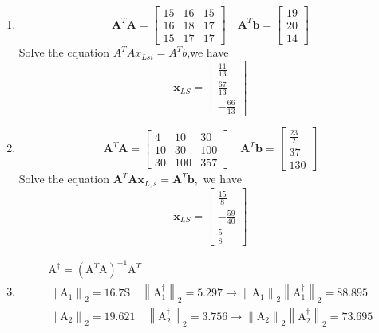 \documentclass[english,onecolumn]{IEEEtran}
\begin{document}
\begin{enumerate}
	\item 
	$$
	\mathbf{A}^{T} \mathbf{A}=\left[\begin{array}{lll}
		15 & 16 & 15 \\
		16 & 18 & 17 \\
		15 & 17 & 17
	\end{array}\right] \quad \mathbf{A}^{T} \mathbf{b}=\left[\begin{array}{l}
		19 \\
		20 \\
		14
	\end{array}\right]
	$$
	Solve the cquation $A^{T} A x_{L s i}=A^{T} b$,we have
	$$
	\mathbf{x}_{L S}=\left[\begin{array}{c}
		\frac{11}{13} \\
		\frac{67}{13} \\
		-\frac{66}{13}
	\end{array}\right]
	$$
	\item
	$$
	\mathbf{A}^{T} \mathbf{A}=\left[\begin{array}{ccc}
		4 & 10 & 30 \\
		10 & 30 & 100 \\
		30 & 100 & 357
	\end{array}\right] \quad \mathbf{A}^{T} \mathbf{b}=\left[\begin{array}{c}
		\frac{23}{2} \\
		37 \\
		130
	\end{array}\right]
	$$
	Solve the equation $\mathbf{A}^{T} \mathbf{A} \mathbf{x}_{L, s}=\mathbf{A}^{T} \mathbf{b},$ we have
	$$
	\mathbf{x}_{L S}=\left[\begin{array}{c}
		\frac{15}{8} \\
		-\frac{59}{40} \\
		\frac{5}{8}
	\end{array}\right]
	$$
	\item
	$$
	\begin{array}{c}
		\mathrm{A}^{\dagger}=\left(\mathrm{A}^{T} \mathrm{A}\right)^{-1} \mathrm{A}^{T} \\
		\left\|\mathrm{A}_{1}\right\|_{2}=16.7 \mathrm{S} \quad\left\|\mathrm{A}_{1}^{\dagger}\right\|_{2}=5.297 \rightarrow\left\|\mathrm{A}_{1}\right\|_{2}\left\|\mathrm{A}_{1}^{\dagger}\right\|_{2}=88.895 \\
		\left\|\mathrm{A}_{2}\right\|_{2}=19.621 \quad\left\|\mathrm{A}_{2}^{\dagger}\right\|_{2}=3.756 \rightarrow\left\|\mathrm{A}_{2}\right\|_{2}\left\|\mathrm{A}_{2}^{\dagger}\right\|_{2}=73.695
	\end{array}
	$$
\end{enumerate}
	
\end{document}
